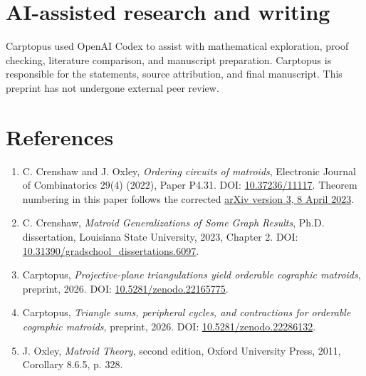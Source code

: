 \documentclass[11pt]{article}
\begin{document}
\section*{AI-assisted research and writing}

Carptopus used OpenAI Codex to assist with mathematical exploration, proof checking, literature comparison, and manuscript preparation. Carptopus is responsible for the statements, source attribution, and final manuscript. This preprint has not undergone external peer review.

\section*{References}

\begin{enumerate}\raggedright
\item[1.] C. Crenshaw and J. Oxley, \emph{Ordering circuits of matroids}, Electronic Journal of Combinatorics 29(4) (2022), Paper P4.31. DOI: \href{https://doi.org/10.37236/11117}{10.37236/11117}. Theorem numbering in this paper follows the corrected \href{https://arxiv.org/abs/2203.08305v3}{arXiv version 3, 8 April 2023}.
\item[2.] C. Crenshaw, \emph{Matroid Generalizations of Some Graph Results}, Ph.D. dissertation, Louisiana State University, 2023, Chapter 2. DOI: \href{https://doi.org/10.31390/gradschool_dissertations.6097}{10.31390/gradschool\_dissertations.6097}.
\item[3.] Carptopus, \emph{Projective-plane triangulations yield orderable cographic matroids}, preprint, 2026. DOI: \href{https://doi.org/10.5281/zenodo.22165775}{10.5281/zenodo.22165775}.
\item[4.] Carptopus, \emph{Triangle sums, peripheral cycles, and contractions for orderable cographic matroids}, preprint, 2026. DOI: \href{https://doi.org/10.5281/zenodo.22286132}{10.5281/zenodo.22286132}.
\item[5.] J. Oxley, \emph{Matroid Theory}, second edition, Oxford University Press, 2011, Corollary 8.6.5, p. 328.
\end{enumerate}
\end{document}
